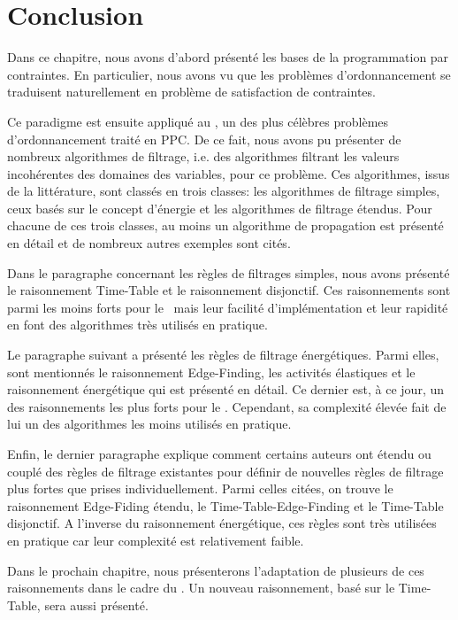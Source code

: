 \section*{Conclusion}

Dans ce chapitre, nous avons d'abord présenté les bases de la
programmation par contraintes. En particulier, nous avons vu que les
problèmes d'ordonnancement se traduisent naturellement en problème de
satisfaction de contraintes. 

Ce paradigme est ensuite appliqué au \CUSP, un des plus célèbres
problèmes d'ordonnancement traité en PPC. De ce fait, nous avons pu
présenter de nombreux algorithmes de filtrage, i.e. des algorithmes
filtrant les valeurs incohérentes des domaines des variables, pour ce
problème. Ces algorithmes, issus de la littérature, sont classés en
trois classes: les algorithmes de filtrage simples, ceux basés sur le
concept d'énergie et les algorithmes de filtrage étendus. Pour chacune
de ces trois classes, au moins un algorithme de propagation est
présenté en détail et de nombreux autres exemples sont cités.

Dans le paragraphe concernant les règles de filtrages simples, nous
avons présenté le raisonnement Time-Table et le raisonnement
disjonctif. Ces raisonnements sont parmi les moins forts pour le
\CUSP~mais leur facilité d'implémentation et leur rapidité en font des
algorithmes très utilisés en pratique. 

Le paragraphe suivant a présenté les règles de filtrage 
énergétiques. Parmi elles, sont mentionnés le raisonnement
Edge-Finding, les activités élastiques et le raisonnement énergétique
qui est présenté en détail. Ce dernier est, à ce jour, un des
raisonnements les plus forts pour le \CUSP. Cependant, sa complexité
élevée fait de lui un des algorithmes les moins utilisés en pratique.

Enfin, le dernier paragraphe explique comment certains auteurs ont
étendu ou couplé des règles de filtrage existantes pour définir de
nouvelles règles de filtrage plus fortes que prises
individuellement. Parmi celles citées, on trouve le raisonnement
Edge-Fiding étendu, le Time-Table-Edge-Finding et le Time-Table
disjonctif. A l'inverse du raisonnement énergétique, ces règles
sont très utilisées en pratique car leur complexité est relativement
faible. 

Dans le prochain chapitre, nous présenterons l'adaptation de plusieurs
de ces raisonnements dans le cadre du \CECSP. Un nouveau raisonnement,
basé sur le Time-Table, sera aussi présenté.